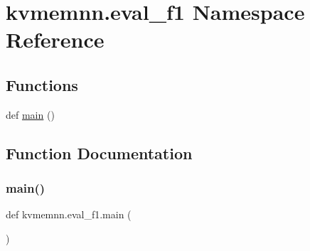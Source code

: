 \hypertarget{namespacekvmemnn_1_1eval__f1}{}\section{kvmemnn.\+eval\+\_\+f1 Namespace Reference}
\label{namespacekvmemnn_1_1eval__f1}
\subsection*{Functions}
\begin{DoxyCompactItemize}
\item 
def \hyperlink{namespacekvmemnn_1_1eval__f1_a37c672effdc33f74f7d18f8c12cd3a52}{main} ()
\end{DoxyCompactItemize}


\subsection{Function Documentation}
\mbox{\label{namespacekvmemnn_1_1eval__f1_a37c672effdc33f74f7d18f8c12cd3a52}} 
\subsubsection{\texorpdfstring{main()}{main()}}
{\footnotesize\ttfamily def kvmemnn.\+eval\+\_\+f1.\+main (\begin{DoxyParamCaption}{ }\end{DoxyParamCaption})}

